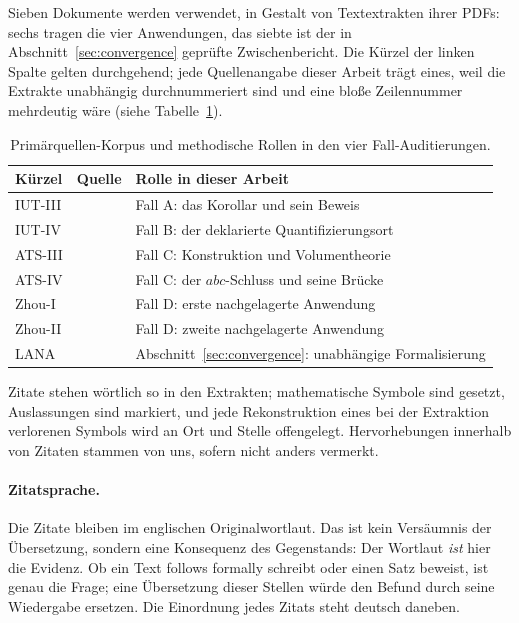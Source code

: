 \documentclass[11pt,a4paper]{article}
\theoremstyle{definition}
\begin{document}
Sieben Dokumente werden verwendet, in Gestalt von Textextrakten ihrer PDFs: sechs
tragen die vier Anwendungen, das siebte ist der in Abschnitt~\ref{sec:convergence}
geprüfte Zwischenbericht. Die Kürzel der linken Spalte gelten durchgehend; jede
Quellenangabe dieser Arbeit trägt eines, weil die Extrakte unabhängig
durchnummeriert sind und eine bloße Zeilennummer mehrdeutig wäre (siehe Tabelle~\ref{tab:primary_sources}).

\begin{table}[htbp]
\centering
\small
\renewcommand{\arraystretch}{1.12}
\begin{tabular}{@{}lll@{}}
\toprule
Kürzel & Quelle & Rolle in dieser Arbeit \\
\midrule
IUT-III & \cite{Mochizuki2021c} & Fall A: das Korollar und sein Beweis \\
IUT-IV & \cite{Mochizuki2021d} & Fall B: der deklarierte Quantifizierungsort \\
ATS-III & \cite{JoshiATSIII} & Fall C: Konstruktion und Volumentheorie \\
ATS-IV & \cite{JoshiATSIV} & Fall C: der $abc$-Schluss und seine Brücke \\
Zhou-I & \cite{ZhouI} & Fall D: erste nachgelagerte Anwendung \\
Zhou-II & \cite{ZhouII} & Fall D: zweite nachgelagerte Anwendung \\
LANA & \cite{LANA2026} & Abschnitt~\ref{sec:convergence}: unabhängige Formalisierung \\
\bottomrule
\end{tabular}
\caption{Primärquellen-Korpus und methodische Rollen in den vier Fall-Auditierungen.}
\label{tab:primary_sources}
\end{table}

Zitate stehen wörtlich so in den Extrakten; mathematische Symbole sind gesetzt,
Auslassungen sind markiert, und jede Rekonstruktion eines bei der Extraktion
verlorenen Symbols wird an Ort und Stelle offengelegt. Hervorhebungen innerhalb
von Zitaten stammen von uns, sofern nicht anders vermerkt.

\paragraph{Zitatsprache.} Die Zitate bleiben im englischen Originalwortlaut. Das
ist kein Versäumnis der Übersetzung, sondern eine Konsequenz des Gegenstands: Der
Wortlaut \emph{ist} hier die Evidenz. Ob ein Text \glqq follows formally\grqq{} schreibt oder
einen Satz beweist, ist genau die Frage; eine Übersetzung dieser Stellen würde
den Befund durch seine Wiedergabe ersetzen. Die Einordnung jedes Zitats steht
deutsch daneben.
\end{document}
